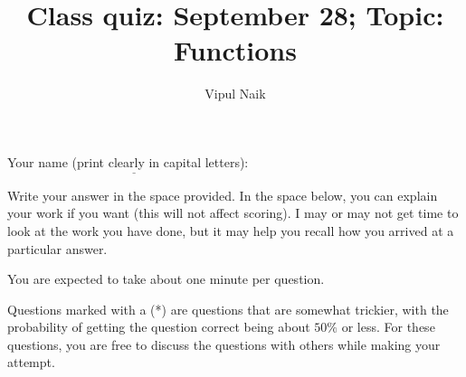 \documentclass[10pt]{amsart}
\title{Class quiz: September 28; Topic: Functions}
\author{Vipul Naik}
\begin{document}
\maketitle

Your name (print clearly in capital letters): $\underline{\qquad\qquad\qquad\qquad\qquad\qquad\qquad\qquad\qquad\qquad}$

Write your answer in the space provided. In the space below, you can
explain your work if you want (this will not affect scoring). I may or
may not get time to look at the work you have done, but it may help
you recall how you arrived at a particular answer.

You are expected to take about one minute per question.

Questions marked with a (*) are questions that are somewhat trickier,
with the probability of getting the question correct being about
$50\%$ or less. For these questions, you are free to discuss the questions
with others while making your attempt.
\end{document}
